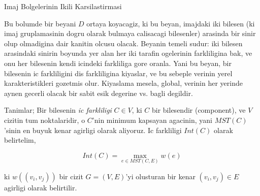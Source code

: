 \documentclass[12pt,fleqn]{article}\usepackage{../common}
\begin{document}
Imaj Bolgelerinin Ikili Karsilastirmasi 

Bu bolumde bir beyani $D$ ortaya koyacagiz, ki bu beyan, imajdaki iki
bilesen (ki imaj gruplamasinin dogru olarak bulmaya calisacagi bilesenler)
arasinda bir sinir olup olmadigina dair kanitin olcusu olacak. Beyanin
temeli sudur: iki bilesen arasindaki sinirin boyunda yer alan her iki
tarafin ogelerinin farkliligina bak, ve onu her bilesenin kendi icindeki
farkliliga gore oranla. Yani bu beyan, bir bilesenin ic farkliligini dis
farkliligina kiyaslar, ve bu sebeple verinin yerel karakteristikleri
gozetmis olur. Kiyaslama mesela, global, verinin her yerinde aynen gecerli
olacak bir sabit esik degerine vs. bagli degildir.

Tanimlar; Bir bilesenin {\em ic farkliligi} $C \in V$, ki $C$ bir
bilesendir (component), ve $V$ cizitin tum noktalaridir, o $C$'nin minimum
kapsayan agacinin, yani $MST(C)$'sinin en buyuk kenar agirligi olarak
aliyoruz. Ic farkliligi $Int(C)$ olarak belirtelim, 

$$ Int(C) = \max_{e \in MST(C,E)} w(e) $$

ki $w((v_i , v_j))$ bir cizit $G = (V,E)$'yi olusturan bir kenar
$(v_i,v_j) \in E$ agirligi olarak belirtilir. 
\end{document}
